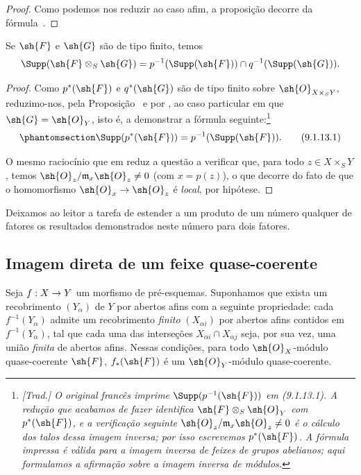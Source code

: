 \documentclass[oneside]{amsart}
\makeatletter
\newcommand{\ega@arrow}[2]{\mathchoice{#1}{#2}{#2}{#2}}
\renewcommand{\to}{\ega@arrow{\longrightarrow}{\rightarrow}}
\let\EGAOriginalLabel\label
\renewcommand{\label}[1]{\phantomsection\EGAOriginalLabel{#1}}
\makeatother
\begin{document}
\begin{proof}
Como podemos nos reduzir ao caso afim, a proposição decorre da
fórmula~.
\end{proof}

\begin{corollary}[9.1.13]
\label{I.9.1.13}
Se $\sh{F}$ e $\sh{G}$ são de tipo finito, temos
\[
  \Supp(\sh{F}\otimes_S\sh{G})=p^{-1}(\Supp(\sh{F}))\cap q^{-1}(\Supp(\sh{G})).
\]
\end{corollary}

\begin{proof}
Como $p^*(\sh{F})$ e $q^*(\sh{G})$ são de tipo finito sobre
$\sh{O}_{X\times_S Y}$, reduzimo-nos, pela Proposição~ e
por , ao caso particular em que $\sh{G}=\sh{O}_Y$, isto
é, a demonstrar a fórmula seguinte:\footnote{\emph{[Trad.] O
original francês imprime $\Supp(p^{-1}(\sh{F}))$ em (9.1.13.1). A redução
que acabamos de fazer identifica $\sh{F}\otimes_S\sh{O}_Y$ com $p^*(\sh{F})$, e a
verificação seguinte $\sh{O}_z/\mathfrak{m}_x\sh{O}_z\neq0$ é o cálculo
dos talos dessa imagem inversa; por isso escrevemos $p^*(\sh{F})$.
A fórmula impressa é válida para a imagem inversa de feixes de grupos abelianos; aqui formulamos a afirmação sobre a imagem inversa de módulos.}}
\[
\label{I.9.1.13.1}
  \Supp(p^*(\sh{F}))=p^{-1}(\Supp(\sh{F})).
  \tag{9.1.13.1}
\]

O mesmo raciocínio que em  reduz a questão a verificar que, para todo
$z\in X\times_S Y$, temos $\sh{O}_z/\mathfrak{m}_x\sh{O}_z\neq0$ (com $x=p(z)$),
o que decorre do fato de que o homomorfismo $\sh{O}_x\to\sh{O}_z$ é \emph{local},
por hipótese.
\end{proof}

Deixamos ao leitor a tarefa de estender a um produto de um número qualquer
de fatores os resultados demonstrados neste número para dois fatores.

\subsection{Imagem direta de um feixe quase-coerente}
\label{subsection:I.9.2}

\begin{proposition}[9.2.1]
\label{I.9.2.1}
Seja $f:X\to Y$ um morfismo de pré-esquemas. Suponhamos que exista um
recobrimento $(Y_\alpha)$ de $Y$ por abertos afins com a seguinte
propriedade: cada $f^{-1}(Y_\alpha)$ admite um recobrimento
\emph{finito} $(X_{\alpha i})$ por abertos afins contidos em
$f^{-1}(Y_\alpha)$, tal que cada uma das interseções
$X_{\alpha i}\cap X_{\alpha j}$ seja, por sua vez, uma união
\emph{finita} de abertos afins. Nessas condições, para todo
$\sh{O}_X$-módulo quase-coerente $\sh{F}$,
$f_*(\sh{F})$ é um $\sh{O}_Y$-módulo quase-coerente.
\end{proposition}
\end{document}
